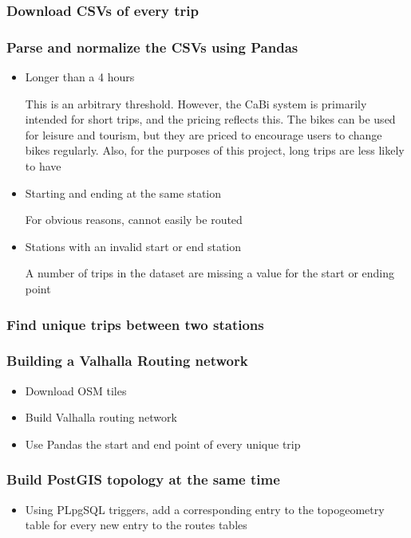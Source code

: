\documentclass{beamer}
\begin{document}
\begin{frame}
    \frametitle{Download CSVs of every trip}


\end{frame}

\begin{frame}
    \frametitle{Parse and normalize the CSVs using Pandas}
    
\begin{itemize}
    \item Longer than a 4 hours
    
    This is an arbitrary threshold. However, the CaBi system is primarily intended for short trips, and the pricing reflects this. The bikes can be used for leisure and tourism, but they are priced to encourage users to change bikes regularly. Also, for the purposes of this project, long trips are less likely to have

    \item Starting and ending at the same station
    
    For obvious reasons, cannot easily be routed

    \item Stations with an invalid start or end station

    A number of trips in the dataset are missing a value for the start or ending point
\end{itemize}
    
\end{frame}

\begin{frame}
    \frametitle{Find unique trips between two stations}

\end{frame}

\begin{frame}
    \frametitle{Building a Valhalla Routing network}

    \begin{itemize}
        \item Download OSM tiles
        \item Build Valhalla routing network
        \item Use Pandas the start and end point of every unique trip
    \end{itemize}
\end{frame}

\begin{frame}
    \frametitle{Build PostGIS topology at the same time}
    \begin{itemize}
        \item Using PLpgSQL triggers, add a corresponding entry to the topogeometry table for every new entry to the routes tables
    \end{itemize}
\end{frame}
\end{document}
